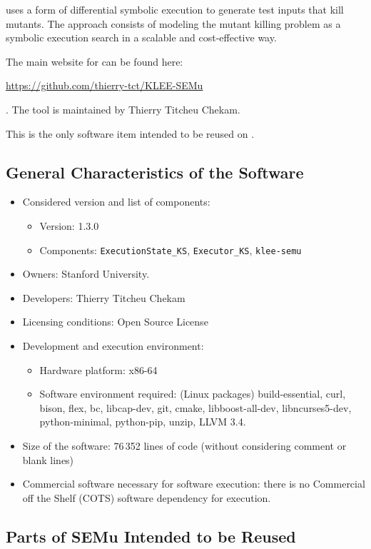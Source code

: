 \SEMU uses a form of differential symbolic execution to generate test inputs that kill mutants. The approach consists of modeling the mutant killing problem as a symbolic execution search in a scalable and cost-effective way. 

The main website for \SEMU can be found here: \begin{scriptsize}\url{https://github.com/thierry-tct/KLEE-SEMu}\end{scriptsize}. The tool is maintained by Thierry Titcheu Chekam.

This is the only software item intended to be reused on \SEMUS.

\subsection{General Characteristics of the Software}

\begin{itemize}
	\item Considered version and list of components:
	\begin{itemize}
		\item Version: 1.3.0
		\item Components: \texttt{ExecutionState\_KS}, \texttt{Executor\_KS}, \texttt{klee-semu}
	\end{itemize}
	\item Owners: Stanford University.
	\item Developers: Thierry Titcheu Chekam
	\item Licensing conditions: Open Source License
	\item Development and execution environment:
	\begin{itemize}
		\item Hardware platform: x86-64
		\item Software environment required: (Linux packages) build-essential, curl, bison, flex, bc, libcap-dev, git, cmake, libboost-all-dev, libncurses5-dev, python-minimal, python-pip, unzip, LLVM 3.4. 
	\end{itemize}
	\item Size of the software: 76\,352 lines of code (without considering comment or blank lines)
	\item Commercial software necessary for software execution: there is no Commercial off the Shelf (COTS) software dependency for execution.
\end{itemize}

\subsection{Parts of SEMu Intended to be Reused}


